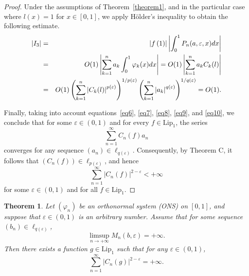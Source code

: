 \documentclass{publmathdeb}
\newtheorem{theorem}{Theorem}[section]
\begin{document}
\begin{proof}
		Under the assumptions of Theorem~\ref{theorem1}, and in the particular case where \( l(x) = 1 \) for \( x \in [0,1] \), 
		we apply Hölder's inequality to obtain the following estimate. 
		\begin{eqnarray}
			\label{eq10} \left|I_3\right| &=& \left|f\left(1\right)\right|\left|\int_{0}^{1}P_n(a, \varepsilon, x)dx\right| \\
			&=& O(1) \left|\sum_{k=1}^{n} a_k \int_{0}^{1} \varphi_{k}(x)dx \right|  
			= O(1) \left|\sum_{k=1}^{n} a_k C_k(l) \right| \notag\\
			&=& O(1) \left(\sum_{k=1}^{n} \left|C_k(l)\right|^{p(\varepsilon)}\right)^{1/p(\varepsilon)} \left(\sum_{k=1}^{n} \left|a_k\right|^{q(\varepsilon)}\right)^{1/q(\varepsilon)}  = O(1).        \notag
		\end{eqnarray}
		
		Finally, taking into account equations~\eqref{eq6}, \eqref{eq7}, \eqref{eq8}, \eqref{eq9}, and \eqref{eq10}, 
		we conclude that for some \(\varepsilon \in (0,1)\) and for every \( f \in \mathrm{Lip}_1 \), the series
		\[
		\sum_{n=1}^{\infty} C_n(f) a_n
		\]
		converges for any sequence \( (a_n) \in \ell_{q(\varepsilon)} \).  
		Consequently, by Theorem C, it follows that \( (C_n(f)) \in \ell_{p(\varepsilon)} \), and hence
		\[
		\sum_{n=1}^{\infty} |C_n(f)|^{2-\varepsilon} < +\infty
		\]
		for some \(\varepsilon \in (0,1)\) and for all \( f \in \mathrm{Lip}_1 \).
	\end{proof}
	
	\begin{theorem}
		\label{theorem2}Let \( (\varphi_n) \) be an orthonormal system (ONS) on \([0,1]\), and suppose that \( \varepsilon \in (0,1) \) is an arbitrary number.  
		Assume that for some sequence \( (b_n) \in \ell_{q(\varepsilon)} \),  
		\begin{equation} \label{eq11}
			\limsup_{n \to +\infty} M_n(b, \varepsilon) = +\infty.
		\end{equation}
		Then there exists a function \( g \in \mathrm{Lip}_1 \) such that for any \( \varepsilon \in (0,1) \),  
		\[
		\sum_{n=1}^\infty |C_n(g)|^{2 - \varepsilon} = +\infty.
		\]	
	\end{theorem}
	
\end{document}

